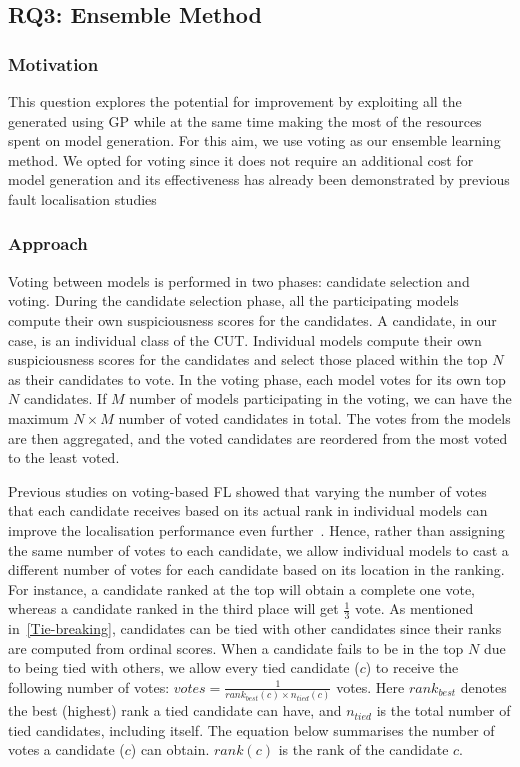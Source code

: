 \subsection{RQ3: Ensemble Method}\label{sec:rq3_ensemble_method}
\subsubsection{Motivation}
This question explores the potential for improvement by exploiting all the \formulas generated using GP while at the same time making the most of the resources spent on model generation.
For this aim, we use voting as our ensemble learning method.
We opted for voting since it does not require an additional cost for model generation and its effectiveness has already been demonstrated by previous fault localisation studies~\cite{sohn2021assisting,Sohn2019aa}

\subsubsection{Approach}

Voting between models is performed in two phases: candidate selection and voting. During the candidate selection phase, all the participating models compute their own suspiciousness scores for the candidates. A candidate, in our case, is an individual class of the CUT. 
Individual models compute their own suspiciousness scores for the candidates and select those placed within the top $N$ as their candidates to vote.
In the voting phase, each model votes for its own top $N$ candidates. If $M$ number of models participating in the voting, we can have the maximum $N \times M$ number of voted candidates in total. The votes from the models are then aggregated, and the voted candidates are reordered from the most voted to the least voted. 

Previous studies on voting-based FL showed that varying the number of votes that each candidate receives based on its actual rank in individual models can improve the localisation performance even further~\cite{sohn2021assisting,Sohn2019aa}.
Hence, rather than assigning the same number of votes to each candidate, we allow individual models to cast a different number of votes for each candidate based on its location in the ranking. 
For instance, a candidate ranked at the top will obtain a complete one vote, whereas a candidate ranked in the third place will get $\frac{1}{3}$ vote. 
As mentioned in~\ref{Tie-breaking}, candidates can be tied with other candidates since their ranks are computed from ordinal scores. When a candidate fails to be in the top $N$ due to being tied with others, we allow every tied candidate ($c$) to receive the following number of votes:
$votes = \frac{1}{rank_{best}(c) \times n_{tied}(c)}$ votes. 
Here $rank_{best}$ denotes the best (highest) rank a tied candidate can have, and $n_{tied}$ is the total number of tied candidates, including itself. The equation below summarises the number of votes a candidate ($c$) can obtain. $rank(c)$ is the rank of the candidate $c$. 


